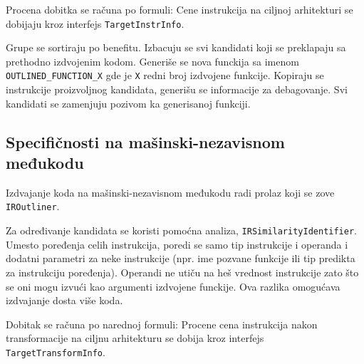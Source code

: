 \documentclass[12pt,oneside]{memoir}
\begin{document}
Procena dobitka se računa po formuli:
Cene instrukcija na ciljnoj arhitekturi se dobijaju kroz interfejs \verb|TargetInstrInfo|.

Grupe se sortiraju po benefitu.
Izbacuju se svi kandidati koji se preklapaju sa prethodno izdvojenim kodom.
Generiše se nova funckija sa imenom \verb|OUTLINED_FUNCTION_X| gde je \verb|X| redni broj izdvojene funkcije.
Kopiraju se instrukcije proizvoljnog kandidata, generišu se informacije za debagovanje.
Svi kandidati se zamenjuju pozivom ka generisanoj funkciji.

\subsection{Specifičnosti na mašinski-nezavisnom međukodu}


Izdvajanje koda na mašinski-nezavisnom međukodu radi prolaz koji se zove \verb|IROutliner|.

Za određivanje kandidata se koristi pomoćna analiza, \verb|IRSimilarityIdentifier|.
Umesto poređenja celih instrukcija, poredi se samo tip instrukcije i operanda i dodatni parametri za neke instrukcije (npr. ime pozvane funkcije ili tip predikta za instrukciju poređenja).
Operandi ne utiču na heš vrednost instrukcije zato što se oni mogu izvući kao argumenti izdvojene funckije.
Ova razlika omogućava izdvajanje dosta više koda.

Dobitak se računa po narednoj formuli:
Procene cena instrukcija nakon transformacije na ciljnu arhitekturu se dobija kroz interfejs \verb|TargetTransformInfo|.
\end{document}
